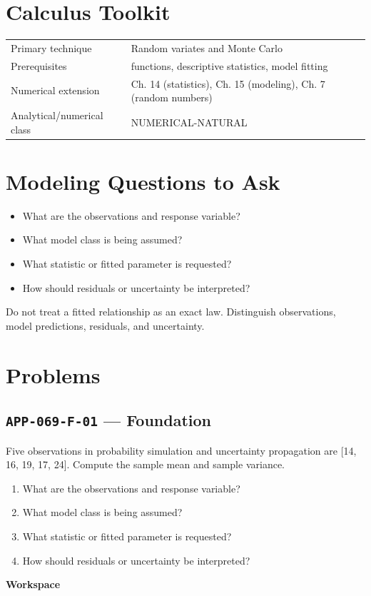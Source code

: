 \documentclass[11pt]{book}
\newcommand{\pid}[1]{\texttt{#1}}
\newcommand{\workspace}{\par\vspace{0.7in}\hrulefill\par\vspace{0.55in}\hrulefill\par}
\begin{document}
\section*{Calculus Toolkit}
\begin{tabularx}{\textwidth}{@{}lX@{}}\toprule
Primary technique & Random variates and Monte Carlo \\
Prerequisites & functions, descriptive statistics, model fitting \\
Numerical extension & Ch. 14 (statistics), Ch. 15 (modeling), Ch. 7 (random numbers) \\
Analytical/numerical class & NUMERICAL-NATURAL \\
\bottomrule\end{tabularx}
\section*{Modeling Questions to Ask}\begin{itemize}
\item What are the observations and response variable?
\item What model class is being assumed?
\item What statistic or fitted parameter is requested?
\item How should residuals or uncertainty be interpreted?
\end{itemize}
\begin{errorbox}Do not treat a fitted relationship as an exact law. Distinguish observations, model predictions, residuals, and uncertainty.\end{errorbox}
\section*{Problems}
\subsection*{\pid{APP-069-F-01} — Foundation}
\begin{problembox}
Five observations in probability simulation and uncertainty propagation are [14, 16, 19, 17, 24]. Compute the sample mean and sample variance.
\end{problembox}
\begin{promptbox}\begin{enumerate}
\item What are the observations and response variable?
\item What model class is being assumed?
\item What statistic or fitted parameter is requested?
\item How should residuals or uncertainty be interpreted?
\end{enumerate}\end{promptbox}
\textbf{Workspace}\workspace
{}
\end{document}
